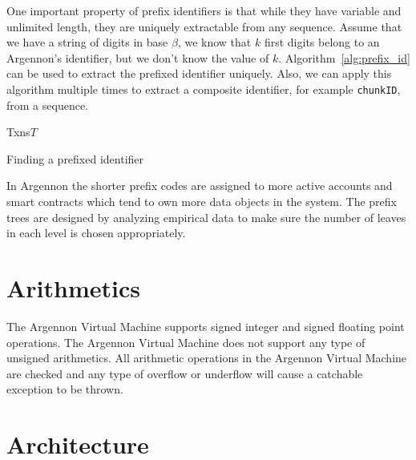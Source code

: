 One important property of prefix identifiers is that while they have variable and unlimited length, they are
uniquely extractable from any sequence. Assume that we have a string of digits in base $\beta$, we
know that $k$ first digits belong to an Argennon's identifier, but we don't know the value of $k$.
Algorithm~\ref{alg:prefix_id} can be used to extract the prefixed identifier uniquely. Also, we can apply this algorithm
multiple times to extract a composite identifier, for example \texttt{chunkID}, from a sequence.

\begin{algorithm}
    \DontPrintSemicolon
    \SetKwData
    {Txns}{$T$}
    \BlankLine
    {
        {
            \;
        }
    }
    \;
    \caption{Finding a prefixed identifier}\label{alg:prefix_id}
\end{algorithm}

In Argennon the shorter prefix codes are assigned to more active accounts and smart contracts which tend to own more
data objects in the system. The prefix trees are designed by analyzing empirical data to make sure the number
of leaves in each level is chosen appropriately.


\section{Arithmetics}\label{sec:arithmetics}

The Argennon Virtual Machine supports signed integer and signed floating point operations. The Argennon Virtual
Machine does not support any type of unsigned arithmetics. All arithmetic operations in the Argennon Virtual Machine
are checked and any type of overflow or underflow will cause a catchable exception to be thrown.

\section{Architecture}\label{sec:arch}


